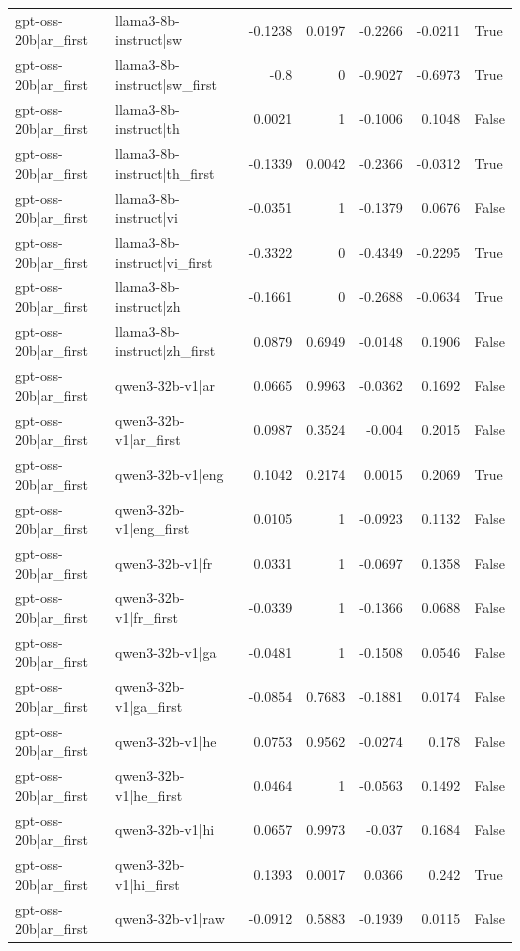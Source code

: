 \begin{table}
\begin{tabular}{l l r r r r l}
gpt-oss-20b|ar_first & llama3-8b-instruct|sw & -0.1238 & 0.0197 & -0.2266 & -0.0211 & True \\
gpt-oss-20b|ar_first & llama3-8b-instruct|sw_first & -0.8 & 0 & -0.9027 & -0.6973 & True \\
gpt-oss-20b|ar_first & llama3-8b-instruct|th & 0.0021 & 1 & -0.1006 & 0.1048 & False \\
gpt-oss-20b|ar_first & llama3-8b-instruct|th_first & -0.1339 & 0.0042 & -0.2366 & -0.0312 & True \\
gpt-oss-20b|ar_first & llama3-8b-instruct|vi & -0.0351 & 1 & -0.1379 & 0.0676 & False \\
gpt-oss-20b|ar_first & llama3-8b-instruct|vi_first & -0.3322 & 0 & -0.4349 & -0.2295 & True \\
gpt-oss-20b|ar_first & llama3-8b-instruct|zh & -0.1661 & 0 & -0.2688 & -0.0634 & True \\
gpt-oss-20b|ar_first & llama3-8b-instruct|zh_first & 0.0879 & 0.6949 & -0.0148 & 0.1906 & False \\
gpt-oss-20b|ar_first & qwen3-32b-v1|ar & 0.0665 & 0.9963 & -0.0362 & 0.1692 & False \\
gpt-oss-20b|ar_first & qwen3-32b-v1|ar_first & 0.0987 & 0.3524 & -0.004 & 0.2015 & False \\
gpt-oss-20b|ar_first & qwen3-32b-v1|eng & 0.1042 & 0.2174 & 0.0015 & 0.2069 & True \\
gpt-oss-20b|ar_first & qwen3-32b-v1|eng_first & 0.0105 & 1 & -0.0923 & 0.1132 & False \\
gpt-oss-20b|ar_first & qwen3-32b-v1|fr & 0.0331 & 1 & -0.0697 & 0.1358 & False \\
gpt-oss-20b|ar_first & qwen3-32b-v1|fr_first & -0.0339 & 1 & -0.1366 & 0.0688 & False \\
gpt-oss-20b|ar_first & qwen3-32b-v1|ga & -0.0481 & 1 & -0.1508 & 0.0546 & False \\
gpt-oss-20b|ar_first & qwen3-32b-v1|ga_first & -0.0854 & 0.7683 & -0.1881 & 0.0174 & False \\
gpt-oss-20b|ar_first & qwen3-32b-v1|he & 0.0753 & 0.9562 & -0.0274 & 0.178 & False \\
gpt-oss-20b|ar_first & qwen3-32b-v1|he_first & 0.0464 & 1 & -0.0563 & 0.1492 & False \\
gpt-oss-20b|ar_first & qwen3-32b-v1|hi & 0.0657 & 0.9973 & -0.037 & 0.1684 & False \\
gpt-oss-20b|ar_first & qwen3-32b-v1|hi_first & 0.1393 & 0.0017 & 0.0366 & 0.242 & True \\
gpt-oss-20b|ar_first & qwen3-32b-v1|raw & -0.0912 & 0.5883 & -0.1939 & 0.0115 & False \\

\end{tabular}
\end{table}
